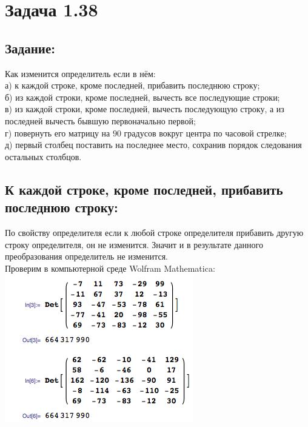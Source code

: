 \section{Задача 1.38}
\subsection{Задание:}
Как изменится определитель если в нём:\\
а) к каждой строке, кроме последней, прибавить последнюю строку;\\
б) из каждой строки, кроме последней, вычесть все последующие строки;\\
в) из каждой строки, кроме последней, вычесть последующую строку, а из последней вычесть бывшую первоначально первой;\\
г) повернуть его матрицу на $ 90 $ градусов вокруг центра по часовой стрелке;\\
д) первый столбец поставить на последнее место, сохранив порядок следования остальных столбцов.\\
\subsection{К каждой строке, кроме последней, прибавить последнюю строку:}
По свойству определителя если к любой строке определителя прибавить другую строку определителя, он не изменится.
Значит и в результате данного преобразования определитель не изменится.
\\[1em]
Проверим в компьютерной среде Wolfram Mathematica:
\\
\includegraphics[scale=0.6]{task/1_38/screen1.png}
